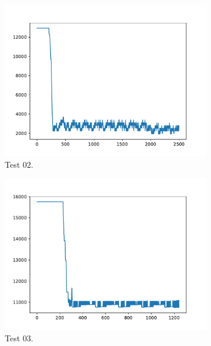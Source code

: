 \begin{figure}[h!]
\begin{subfigure}{0.35
            \textwidth}
        \includegraphics[width=\textwidth]{../logs/test02.pdf}
        \caption{Test $02$.}
    \end{subfigure}
    \begin{subfigure}{0.35
            \textwidth}
        \includegraphics[width=\textwidth]{../logs/test03.pdf}
        \caption{Test $03$.}
    \end{subfigure}
    \begin{subfigure}{0.35
            \textwidth}

\end{subfigure}
\end{figure}
